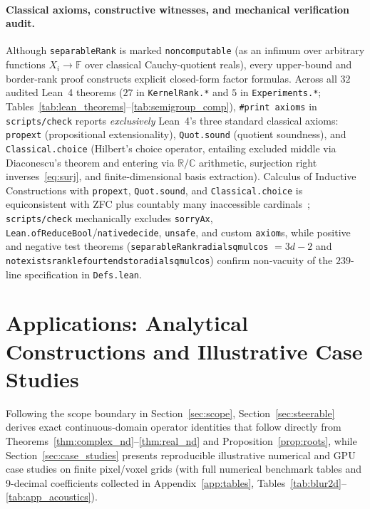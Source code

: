 \documentclass[11pt,a4paper]{article}
\theoremstyle{plain}
\theoremstyle{definition}
\newcommand{\R}{\mathbb{R}}
\newcommand{\C}{\mathbb{C}}
\newcommand{\Field}{\mathbb{F}}
\DeclareRobustCommand{\leanid}[1]{{\def\_{\textunderscore\allowbreak}\texttt{#1}}}
\begin{document}
\paragraph{Classical axioms, constructive witnesses, and mechanical verification audit.}
Although \leanid{separableRank} is marked \texttt{noncomput\-able} (as an infimum over arbitrary functions $X_i \to \Field$ over classical Cauchy-quotient reals), every upper-bound and border-rank proof constructs explicit closed-form factor formulas. Across all $32$ audited Lean~4 theorems ($27$ in \texttt{KernelRank.*} and $5$ in \texttt{Experiments.*}; Tables~\ref{tab:lean_theorems}--\ref{tab:semigroup_comp}), \texttt{\#print axioms} in \texttt{scripts/check} reports \emph{exclusively} Lean~4's three standard classical axioms: \texttt{propext} (propositional extensionality), \texttt{Quot.sound} (quotient soundness), and \texttt{Classical.\allowbreak choice} (Hilbert's choice operator, entailing excluded middle via Diaconescu's theorem and entering via $\R/\C$ arithmetic, surjection right inverses~\eqref{eq:surj}, and finite-dimensional basis extraction). Calculus of Inductive Constructions with \texttt{propext}, \texttt{Quot.sound}, and \texttt{Classical.\allowbreak choice} is equiconsistent with ZFC plus countably many inaccessible cardinals~\cite{moura2021lean4,mathlib2020}; \texttt{scripts/check} mechanically excludes \texttt{sorryAx}, \texttt{Lean.\allowbreak ofReduceBool}/\leanid{native\_decide}, \texttt{unsafe}, and custom \texttt{axiom}s, while positive and negative test theorems (\leanid{separableRank\_radial\_sq\_mul\_cos} $= 3d - 2$ and \leanid{not\_exists\_rank\_le\_four\_tendsto\_radial\_sq\_mul\_cos}) confirm non-vacuity of the $239$-line specification in \texttt{Defs.lean}.

\section{Applications: Analytical Constructions and Illustrative Case Studies}\label{sec:applications}

Following the scope boundary in Section~\ref{sec:scope}, Section~\ref{sec:steerable} derives exact continuous-domain operator identities that follow directly from Theorems~\ref{thm:complex_nd}--\ref{thm:real_nd} and Proposition~\ref{prop:roots}, while Section~\ref{sec:case_studies} presents reproducible illustrative numerical and GPU case studies on finite pixel/voxel grids (with full numerical benchmark tables and 9-decimal coefficients collected in Appendix~\ref{app:tables}, Tables~\ref{tab:blur2d}--\ref{tab:app_acoustics}).
\end{document}
